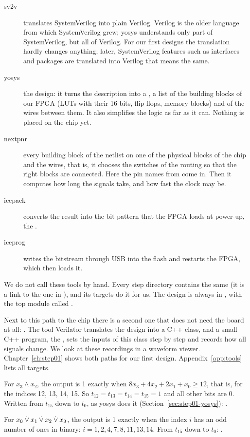 \begin{description}
\item[sv2v] translates SystemVerilog into plain Verilog. Verilog is the older
  language from which SystemVerilog grew; yosys understands only part of
  SystemVerilog, but all of Verilog. For our first designs the translation
  hardly changes anything; later, SystemVerilog features such as interfaces
  and packages are translated into Verilog that means the same.
\item[yosys]  the design: it turns the description into a
  , a list of the building blocks of our FPGA (LUTs with their 16
  bits, flip-flops, memory blocks) and of the wires between them. It also
  simplifies the logic as far as it can. Nothing is placed on the chip yet.
\item[nextpnr]  every building block of the netlist on one of the
  physical blocks of the chip and  the wires, that is, it chooses
  the switches of the routing so that the right blocks are connected. Here the
  pin names from  come in. Then it computes how long the
  signals take, and how fast the clock may be.
\item[icepack] converts the result into the bit pattern that the FPGA loads at
  power-up, the .
\item[iceprog] writes the bitstream through USB into the flash and restarts
  the FPGA, which then loads it.
\end{description}

We do not call these tools by hand. Every step directory contains the same
 (it is a link to the one in ), and its
targets do it for us. The design is always in , with the top
module called .

Next to this path to the chip there is a second one that does not need the
board at all: . The tool Verilator translates the design into
a C++ class, and a small C++ program, the , sets the inputs of
this class step by step and records how all signals change. We look at these
recordings in a waveform viewer. Chapter~\ref{ch:step01} shows both paths for
our first design. Appendix~\ref{app:tools} lists all  targets.

\solutions

\solution
For $x_3 \wedge x_2$, the output is 1 exactly when $8x_3 + 4x_2 + 2x_1 + x_0
\ge 12$, that is, for the indices 12, 13, 14, 15. So $t_{12} = t_{13} = t_{14}
= t_{15} = 1$ and all other bits are 0. Written from $t_{15}$ down to $t_0$, as
yosys does it (Section~\ref{sec:step01-yosys}):
.

For $x_0 \mathbin{\dot{\lor}} x_1 \mathbin{\dot{\lor}} x_2 \mathbin{\dot{\lor}} x_3$, the output is 1 exactly when the
index $i$ has an odd number of ones in binary: $i = 1, 2, 4, 7, 8, 11, 13, 14$.
From $t_{15}$ down to $t_0$: .
